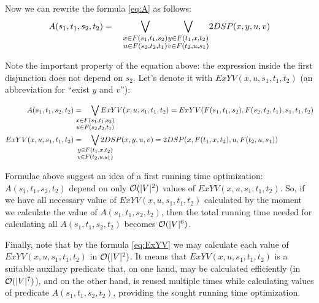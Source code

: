 Now we can rewrite the formula \eqref{eq:A} as follows:
\begin{equation} 
    A(s_1, t_1, s_2, t_2) = \quad
        {\bigvee_{
        \large \substack{
            x \in F(s_1, t_1, s_2)\\ 
            u \in F(s_2, t_2, t_1) 
        }
        }}
        {\bigvee_{
        \large \substack{
            y \in F(t_1, x, t_2)\\ 
            v \in F(t_2, u, s_1) 
        }
        }} 2DSP(x, y, u, v)
\end{equation}

Note the important property of the equation above: the expression inside the first disjunction does not depend on $s_2$. Let's denote it with $ExYV(x, u, s_1, t_1, t_2)$ (an abbreviation for ``exist $y$ and $v$''):

\begin{align} \label{eq:ExYV}
    A(s_1, t_1, s_2, t_2) &= \quad
       \smashoperator{\bigvee_{
        \large \substack{
            x \in F(s_1, t_1, s_2)\\ 
            u \in F(s_2, t_2, t_1) 
        }
        }} ExYV(x, u, s_1, t_1, t_2) = ExYV(F(s_1, t_1, s_2), F(s_2, t_2, t_1), s_1, t_1, t_2)\\
    ExYV(x, u, s_1, t_1, t_2) &= \quad
        \smashoperator{\bigvee_{
        \large \substack{
            y \in F(t_1, x, t_2)\\ 
            v \in F(t_2, u, s_1) 
        }
        }} 2DSP(x, y, u, v) = 2DSP(x, F(t_1, x, t_2), u, F(t_2, u, s_1))\\ 
\end{align}

Formulae above suggest an idea of a first running time optimization: $A(s_1, t_1, s_2, t_2)$ depend on only $\mathcal{O}(|V|^2)$ values of $ExYV(x, u, s_1, t_1, t_2)$. So, if we have all necessary value of $ExYV(x, u, s_1, t_1, t_2)$ calculated by the moment we calculate the value of $A(s_1, t_1, s_2, t_2)$, then the total running time needed for calculating all $A(s_1, t_1, s_2, t_2)$ becomes $\mathcal{O}(|V|^6)$.

Finally, note that by the formula \eqref{eq:ExYV} we may calculate each value of $ExYV(x, u, s_1, t_1, t_2)$ in $\mathcal{O}(|V|^2)$. It means that $ExYV(x, u, s_1, t_1, t_2)$ is a suitable auxilary predicate that, on one hand, may be calculated efficiently (in $\mathcal{O}(|V|^7)$), and on the other hand, is reused multiple times while calculating values of predicate $A(s_1, t_1, s_2, t_2)$, providing the sought running time optimization.

